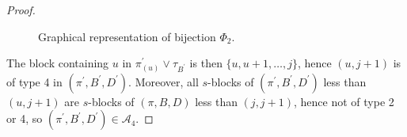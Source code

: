 \documentclass{amsart}
\begin{document}
\begin{proof}
\begin{center}
{\begin{figure}[H]
\begin{tikzpicture}
%  			
  			
  			
  		
  	\end{tikzpicture}
  	\caption{Graphical representation of bijection $\Phi_2$.}
  	\label{Fig:5}
  	\end{figure}
  }
  \end{center}
  
   The block containing $u $ in $ \pi^{\prime}_ {(u)} \vee \tau_{B^\prime}$ is then $\{u, u+1, \dots, j\} $, hence $ (u, j+1)$ is of type 4 in 
   $(\pi^\prime, B^\prime, D^\prime)$.
    Moreover, all $s$-blocks of $(\pi^\prime, B^\prime, D^\prime)$ less than $ (u, j+1)$ are $s$-blocks of $(\pi, B, D)$ less than $(j, j+1)$, hence not of type 2 or 4, so $(\pi^\prime, B^\prime, D^\prime)\in \mathcal{A}_4$.
  

\end{proof}
\end{document}
